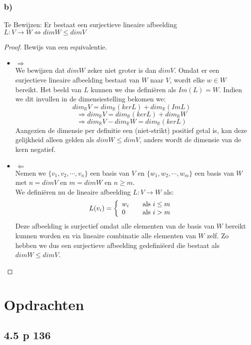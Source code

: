 \documentclass[lineaire_algebra_oplossingen.tex]{subfiles}
\begin{document}
\subsubsection*{b)}
Te Bewijzen:
Er bestaat een surjectieve lineaire afbeelding $L:V\rightarrow W \Leftrightarrow dimW\le dimV$
\begin{proof}
Bewijs van een equivalentie.
\begin{itemize}
\item $\Rightarrow$\\
We bewijzen dat $dimW$ zeker niet groter is dan $dimV$. Omdat er een surjectieve lineaire afbeelding bestaat van $W$ naar $V$, wordt elke $w\in W$ bereikt. Het beeld van $L$ kunnen we dus defini\"eren als $Im(L)=W$. Indien we dit invullen in de dimensiestelling bekomen we:
\[dim_{\mathbb{R}} V = dim_{\mathbb{R}} (kerL) + dim_{\mathbb{R}} (ImL)\]
\[\Rightarrow dim_{\mathbb{R}} V = dim_{\mathbb{R}} (kerL) + dim_{\mathbb{R}} W\]
\[\Rightarrow dim_{\mathbb{R}} V - dim_{\mathbb{R}} W= dim_{\mathbb{R}} (kerL)\]
Aangezien de dimensie per definitie een (niet-strikt) positief getal is, kan deze gelijkheid alleen gelden als $dim W \leq dim V$, anders wordt de dimensie van de kern negatief.
\item $\Leftarrow$\\
Nemen we $\{v_1,v_2,\cdots,v_n\}$ een basis van $V$ en $\{w_1,w_2,\cdots,w_m\}$ een basis van $W$ met $n=dim V$ en $m=dim W$ en $n \geq m$.\\
We defini\"eren nu de lineaire afbeelding $L:V \rightarrow W$ als:
\[ L(v_i) = \left\{
  \begin{array}{l l}
    w_i & \quad \text{als $i \leq m$}\\
    0 & \quad \text{als $i > m$}\\
  \end{array} \right.
\]
Deze afbeelding is surjectief omdat alle elementen van de basis van $W$ bereikt kunnen worden en via lineaire combinatie alle elementen van $W$ zelf. Zo hebben we dus een surjectieve afbeelding gedefini\"eerd die bestaat als $dim W \leq dim V$.

\end{itemize}
\end{proof}

\section{Opdrachten}

\subsection{4.5 p 136}
\end{document}

